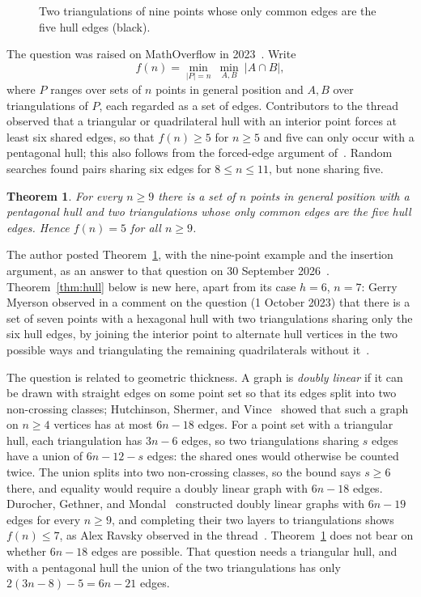 \documentclass[11pt]{amsart}
\newtheorem{theorem}{Theorem}
\theoremstyle{definition}
\begin{document}
\begin{figure}[t]
\centering
\caption{Two triangulations of nine points whose only common edges are the five hull edges (black).}\label{fig:nine}
\end{figure}

The question was raised on MathOverflow in 2023~\cite{MO}. Write
\[
f(n)=\min_{|P|=n}\ \min_{A,B}\ |A\cap B|,
\]
where $P$ ranges over sets of $n$ points in general position and $A,B$ over triangulations of $P$, each regarded as a set of edges. Contributors to the thread observed that a triangular or quadrilateral hull with an interior point forces at least six shared edges, so that $f(n)\geq5$ for $n\geq5$ and five can only occur with a pentagonal hull; this also follows from the forced-edge argument of~\cite{HSV}. Random searches found pairs sharing six edges for $8\leq n\leq11$, but none sharing five.

\begin{theorem}\label{thm:main}
For every $n\geq9$ there is a set of $n$ points in general position with a pentagonal hull and two triangulations whose only common edges are the five hull edges. Hence $f(n)=5$ for all $n\geq9$.
\end{theorem}

The author posted Theorem~\ref{thm:main}, with the nine-point example and the insertion argument, as an answer to that question on 30 September 2026~\cite{MOAnswer}. Theorem~\ref{thm:hull} below is new here, apart from its case $h=6$, $n=7$: Gerry Myerson observed in a comment on the question (1 October 2023) that there is a set of seven points with a hexagonal hull with two triangulations sharing only the six hull edges, by joining the interior point to alternate hull vertices in the two possible ways and triangulating the remaining quadrilaterals without it~\cite{MO}.

The question is related to geometric thickness. A graph is \emph{doubly linear} if it can be drawn with straight edges on some point set so that its edges split into two non-crossing classes; Hutchinson, Shermer, and Vince~\cite{HSV} showed that such a graph on $n\geq4$ vertices has at most $6n-18$ edges. For a point set with a triangular hull, each triangulation has $3n-6$ edges, so two triangulations sharing $s$ edges have a union of $6n-12-s$ edges: the shared ones would otherwise be counted twice. The union splits into two non-crossing classes, so the bound says $s\geq6$ there, and equality would require a doubly linear graph with $6n-18$ edges. Durocher, Gethner, and Mondal~\cite{DGM} constructed doubly linear graphs with $6n-19$ edges for every $n\geq9$, and completing their two layers to triangulations shows $f(n)\leq7$, as Alex Ravsky observed in the thread~\cite{MO}. Theorem~\ref{thm:main} does not bear on whether $6n-18$ edges are possible. That question needs a triangular hull, and with a pentagonal hull the union of the two triangulations has only $2(3n-8)-5=6n-21$ edges.
\end{document}
